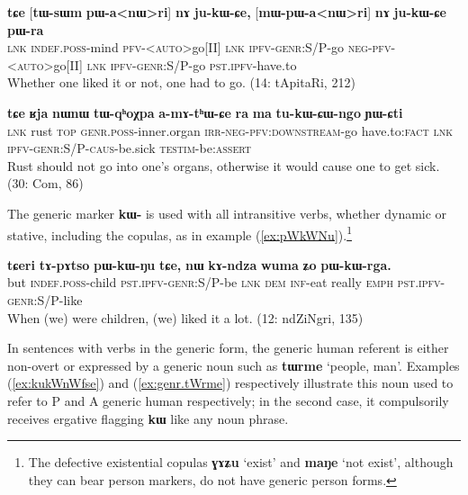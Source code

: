 \documentclass[oneside,a4paper,11pt]{article}
\newcommand{\ipa}[1]{\textbf{\phon\mbox{#1}}} %
\newcommand{\refb}[1]{(\ref{#1})}
\begin{document}
\begin{exe}
\ex  \label{ex:pannWri}
\gll
\ipa{tɕe}  	[\ipa{tɯ-sɯm}  	\textbf{\ipa{pɯ-a<nɯ>ri}}]  	\ipa{nɤ}  	\ipa{ju-kɯ-ɕe,}  	[\textbf{\ipa{mɯ-pɯ-a<nɯ>ri}}]  	\ipa{nɤ}  	\ipa{ju-kɯ-ɕe}  	\ipa{pɯ-ra}  \\
\textsc{lnk} \textsc{indef.poss}-mind  \textsc{pfv-<auto>}go[II] \textsc{lnk} \textsc{ipfv-genr}:S/P-go \textsc{neg-pfv-<auto>}go[II] \textsc{lnk} \textsc{ipfv-genr}:S/P-go \textsc{pst.ipfv}-have.to \\
\glt Whether one liked it or not, one had to go. (14: tApitaRi, 212)
\end{exe}


\begin{exe}
\ex \label{ex:tukWCWngo}
\gll  \ipa{tɕe} 	\ipa{ʁja} 	\ipa{nɯnɯ} 	\ipa{tɯ-qʰoχpa} 	\ipa{a-mɤ-tʰɯ-ɕe} 	\ipa{ra} 	\ipa{ma} 	\ipa{tu-kɯ-ɕɯ-ngo} 	\ipa{ɲɯ-ɕti} \\
\textsc{lnk} rust \textsc{top} \textsc{genr.poss}-inner.organ \textsc{irr-neg-pfv:downstream}-go have.to:\textsc{fact} \textsc{lnk} \textsc{ipfv-genr:S/P-caus}-be.sick  \textsc{testim}-be:\textsc{assert} \\
\glt Rust should not go into one's organs, otherwise it would cause one to get sick. (30: Com, 86)
\end{exe}

The generic marker \ipa{kɯ-} is used with all intransitive verbs, whether dynamic or stative, including the copulas, as in example \refb{ex:pWkWNu}.\footnote{The defective existential copulas \ipa{ɣɤʑu} `exist' and \ipa{maŋe} `not exist', although they can bear person markers, do not have generic person forms. }

\begin{exe}
\ex \label{ex:pWkWNu}
\gll
\ipa{tɕeri} 	\ipa{tɤ-pɤtso} 	\ipa{pɯ-kɯ-ŋu} 	\ipa{tɕe,} 	\ipa{nɯ} 	\ipa{kɤ-ndza} 	\ipa{wuma} 	\ipa{ʑo} 	\ipa{pɯ-kɯ-rga.} \\
but \textsc{indef.poss}-child \textsc{pst.ipfv-genr}:S/P-be \textsc{lnk} \textsc{dem} \textsc{inf}-eat really \textsc{emph} \textsc{pst.ipfv-genr}:S/P-like \\
\glt When (we) were children, (we) liked it a lot. (12: ndZiNgri, 135)
\end{exe}

In sentences with verbs in the generic form, the generic human referent is either non-overt or expressed by a generic noun such as \ipa{tɯrme} `people, man'. Examples \refb{ex:kukWnWfse} and \refb{ex:genr.tWrme} respectively illustrate this noun used to  refer to P and A generic human respectively; in the second case, it   compulsorily receives  ergative flagging \ipa{kɯ} like any noun phrase.
\end{document}
